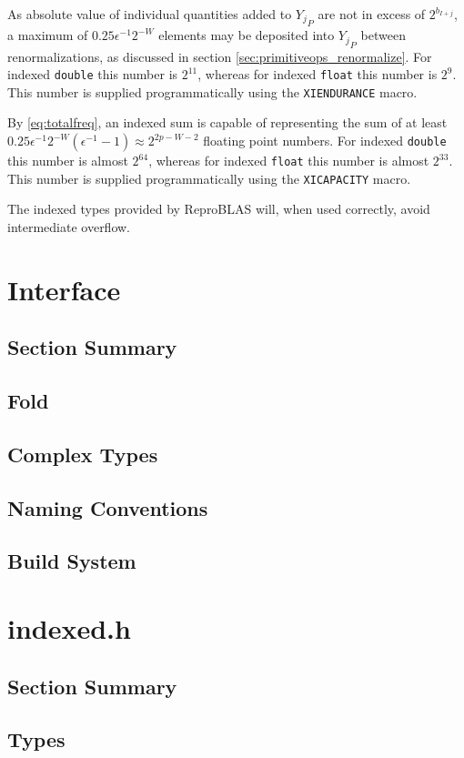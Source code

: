 \documentclass[12pt]{article}
\theoremstyle{definition}
\numberwithin{equation}{section}
\numberwithin{figure}{section}
\begin{document}
    As absolute value of individual quantities added to ${Y_j}_P$ are not in excess of $2^{b_{I + j}}$, a maximum of $0.25\epsilon^{-1}2^{-W}$ elements may be deposited into ${Y_j}_P$ between renormalizations, as discussed in section \ref{sec:primitiveops_renormalize}. For indexed \texttt{double} this number is $2^{11}$, whereas for indexed \texttt{float} this number is $2^9$. This number is supplied programmatically using the \texttt{XIENDURANCE} macro.

    By \eqref{eq:totalfreq}, an indexed sum is capable of representing the sum of at least $0.25\epsilon^{-1}2^{-W}  (\epsilon^{-1} - 1) \approx 2^{2  p - W - 2}$ floating point numbers. For indexed \texttt{double} this number is almost $2^{64}$, whereas for indexed \texttt{float} this number is almost $2^{33}$. This number is supplied programmatically using the \texttt{XICAPACITY} macro.

    The indexed types provided by ReproBLAS will, when used correctly, avoid intermediate overflow.

\section{Interface}
  \subsection{Section Summary}
  \subsection{Fold}
  \subsection{Complex Types}
  \subsection{Naming Conventions}
  \subsection{Build System}
\section{indexed.h}
  \subsection{Section Summary}
  \subsection{Types}
\end{document}
